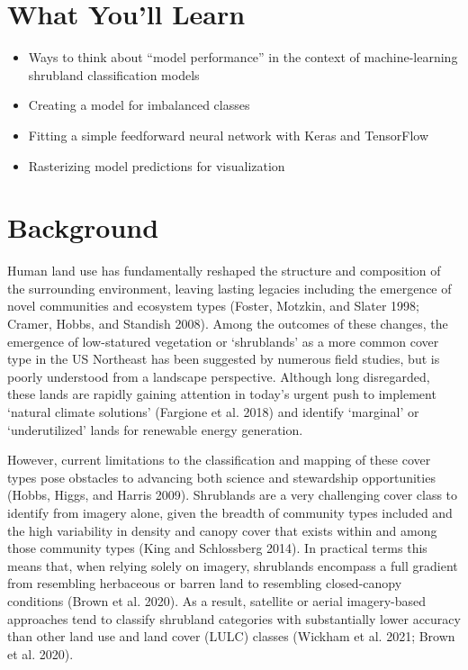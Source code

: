 \documentclass[
  letterpaper,
  DIV=11,
  numbers=noendperiod]{scrartcl}
\providecommand{\tightlist}{%
  \setlength{\itemsep}{0pt}\setlength{\parskip}{0pt}}\usepackage{longtable,booktabs,array}
\begin{document}
\hypertarget{what-youll-learn}{%
\section{What You'll Learn}\label{what-youll-learn}}

\begin{itemize}
\tightlist
\item
  Ways to think about ``model performance'' in the context of
  machine-learning shrubland classification models
\item
  Creating a model for imbalanced classes
\item
  Fitting a simple feedforward neural network with Keras and TensorFlow
\item
  Rasterizing model predictions for visualization
\end{itemize}

\hypertarget{background}{%
\section{Background}\label{background}}

Human land use has fundamentally reshaped the structure and composition
of the surrounding environment, leaving lasting legacies including the
emergence of novel communities and ecosystem types (Foster, Motzkin, and
Slater 1998; Cramer, Hobbs, and Standish 2008). Among the outcomes of
these changes, the emergence of low-statured vegetation or `shrublands'
as a more common cover type in the US Northeast has been suggested by
numerous field studies, but is poorly understood from a landscape
perspective. Although long disregarded, these lands are rapidly gaining
attention in today's urgent push to implement `natural climate
solutions' (Fargione et al. 2018) and identify `marginal' or
`underutilized' lands for renewable energy generation.

However, current limitations to the classification and mapping of these
cover types pose obstacles to advancing both science and stewardship
opportunities (Hobbs, Higgs, and Harris 2009). Shrublands are a very
challenging cover class to identify from imagery alone, given the
breadth of community types included and the high variability in density
and canopy cover that exists within and among those community types
(King and Schlossberg 2014). In practical terms this means that, when
relying solely on imagery, shrublands encompass a full gradient from
resembling herbaceous or barren land to resembling closed-canopy
conditions (Brown et al. 2020). As a result, satellite or aerial
imagery-based approaches tend to classify shrubland categories with
substantially lower accuracy than other land use and land cover (LULC)
classes (Wickham et al. 2021; Brown et al. 2020).
\end{document}
